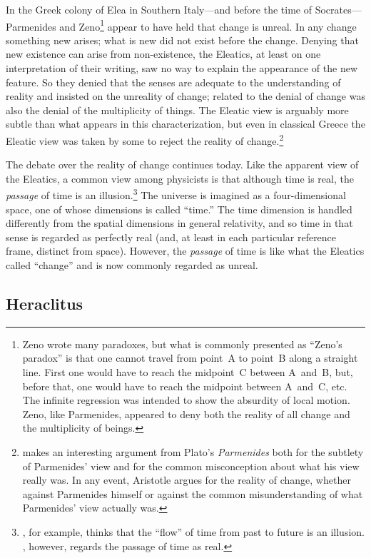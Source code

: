 \documentclass[twocolumn]{article}
\begin{document}
In the Greek colony of Elea in Southern Italy---and before the time of
Socrates---Parmenides and Zeno\footnote{%
   Zeno wrote many paradoxes, but what is commonly presented as ``Zeno's
   paradox'' is that one cannot travel from point~A to point~B along a straight
   line.  First one would have to reach the midpoint~C between A~and~B, but,
   before that, one would have to reach the midpoint between A~and~C, etc.  The
   infinite regression was intended to show the absurdity of local motion.
   Zeno, like Parmenides, appeared to deny both the reality of all change and
   the multiplicity of beings.%
}
appear to have held that change is unreal.  In any change something new arises;
what is new did not exist before the change.  Denying that new existence can
arise from non-existence, the Eleatics, at least on one interpretation of their
writing, saw no way to explain the appearance of the new feature.  So they
denied that the senses are adequate to the understanding of reality and
insisted on the unreality of change; related to the denial of change was also
the denial of the multiplicity of things.  The Eleatic view is arguably more
subtle than what appears in this characterization, but even in classical Greece
the Eleatic view was taken by some to reject the reality of change.\footnote{%
   \cite{p2017} makes an interesting argument from Plato's {\it Parmenides}
   both for the subtlety of Parmenides' view and for the common misconception
   about what his view really was.  In any event, Aristotle argues for the
   reality of change, whether against Parmenides himself or against the common
   misunderstanding of what Parmenides' view actually was.%
}

The debate over the reality of change continues today.  Like the apparent view
of the Eleatics, a common view among physicists is that although time is real,
the \emph{passage} of time is an illusion.\footnote{%
   \cite{c2015}, for example, thinks that the ``flow'' of time from past to
   future is an illusion. \cite{s2013}, however, regards the passage of time as
   real.%
}
The universe is imagined as a four-dimensional space, one of whose dimensions
is called ``time.''  The time dimension is handled differently from the spatial
dimensions in general relativity, and so time in that sense is regarded as
perfectly real (and, at least in each particular reference frame, distinct from
space).  However, the \emph{passage} of time is like what the Eleatics called
``change'' and is now commonly regarded as unreal.

\subsection{Heraclitus}
\end{document}
